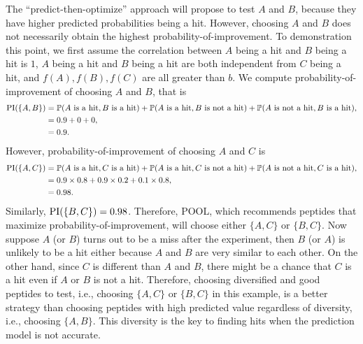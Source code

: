 The ``predict-then-optimize'' approach will propose to test $A$ and $B$, because they have higher predicted probabilities being a hit. 
However, choosing $A$ and $B$ does not necessarily obtain the highest probability-of-improvement. To demonstration this point, 
we first assume the correlation between $A$ being a hit and $B$ being a hit is $1$, $A$ being a hit and $B$ being a hit 
are both independent from $C$ being a hit, and $f(A), f(B), f(C)$ are all greater than $b$. We compute probability-of-improvement
of choosing $A$ and $B$, that is
\begin{equation*}
\begin{split}
\text{PI} (\{A, B\}) &= \mathbb{P} (A \text{ is a hit}, B \text{ is a hit}) + \mathbb{P} (A \text{ is a hit}, B \text{ is not a hit}) + \mathbb{P} (A \text{ is not a hit}, B \text{ is a hit}), \\
&= 0.9 + 0 + 0, \\
&= 0.9.
\end{split}
\end{equation*}
However, probability-of-improvement of choosing $A$ and $C$ is
\begin{equation*}
\begin{split}
\text{PI} (\{A, C\}) &= \mathbb{P} (A \text{ is a hit}, C \text{ is a hit}) + \mathbb{P} (A \text{ is a hit}, C \text{ is not a hit}) + \mathbb{P} (A \text{ is not a hit}, C \text{ is a hit}), \\
&= 0.9 \times 0.8 + 0.9 \times 0.2 + 0.1 \times 0.8, \\
&= 0.98.
\end{split}
\end{equation*}
Similarly, $\text{PI}(\{B, C\})=0.98$. Therefore, POOL, which recommends peptides that maximize probability-of-improvement, will choose either 
$\{A, C\}$ or $\{B, C\}$. Now suppose $A$ (or $B$) turns out to be a miss after
the experiment, then $B$ (or $A$) is unlikely to be a hit either because $A$ and $B$ are very similar to each other. On the other hand, since $C$ is 
different than $A$ and $B$, there might be a chance that $C$ is a hit even if $A$ or $B$ is not a hit. 
Therefore, choosing diversified and good peptides to test, i.e., choosing $\{A, C\}$ or $\{B, C\}$ in this example, 
is a better strategy than choosing peptides with high predicted value regardless of diversity, i.e., choosing $\{A, B\}$. This diversity
is the key to finding hits when the prediction model is not accurate.


